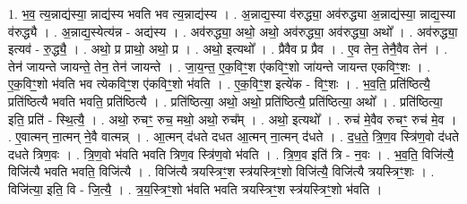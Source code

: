 \documentclass[17pt]{extarticle}
\begin{document}
1. भ॒व॒ त्य॒न्नाद्य॑स्या॒ न्नाद्य॑स्य भवति भव त्य॒न्नाद्य॑स्य । . अ॒न्नाद्य॒स्या व॑रुद्ध्या॒ अव॑रुद्ध्या अ॒न्नाद्य॑स्या॒ न्नाद्य॒स्या व॑रुद्ध्यै । . अ॒न्नाद्य॒स्येत्य॑न्न - अद्य॑स्य । . अव॑रुद्ध्या॒ अथो॒ अथो॒ अव॑रुद्ध्या॒ अव॑रुद्ध्या॒ अथो᳚ । . अव॑रुद्ध्या॒ इत्यव॑ - रु॒द्ध्यै॒ । . अथो॒ प्र प्राथो॒ अथो॒ प्र । . अथो॒ इत्यथो᳚ । . प्रैवैव प्र प्रैव । . ए॒व तेन॒ तेनै॒वैव तेन॑ । . तेन॑ जायन्ते जायन्ते॒ तेन॒ तेन॑ जायन्ते । . जा॒य॒न्त॒ ए॒क॒विꣳ॒॒श ए॑कविꣳ॒॒शो जा॑यन्ते जायन्त एकविꣳ॒॒शः । . ए॒क॒विꣳ॒॒शो भ॑वति भव त्येकविꣳ॒॒श ए॑कविꣳ॒॒शो भ॑वति । . ए॒क॒विꣳ॒॒श इत्ये॑क - विꣳ॒॒शः । . भ॒व॒ति॒ प्रति॑ष्ठित्यै॒ प्रति॑ष्ठित्यै भवति भवति॒ प्रति॑ष्ठित्यै । . प्रति॑ष्ठित्या॒ अथो॒ अथो॒ प्रति॑ष्ठित्यै॒ प्रति॑ष्ठित्या॒ अथो᳚ । . प्रति॑ष्ठित्या॒ इति॒ प्रति॑ - स्थि॒त्यै॒ । . अथो॒ रुचꣳ॒॒ रुच॒ मथो॒ अथो॒ रुच᳚म् । . अथो॒ इत्यथो᳚ । . रुच॑ मे॒वैव रुचꣳ॒॒ रुच॑ मे॒व । . ए॒वात्मन् ना॒त्मन् ने॒वै वात्मन्न् । . आ॒त्मन् द॑धते दधत आ॒त्मन् ना॒त्मन् द॑धते । . द॒ध॒ते॒ त्रि॒ण॒व स्त्रि॑ण॒वो द॑धते दधते त्रिण॒वः । . त्रि॒ण॒वो भ॑वति भवति त्रिण॒व स्त्रि॑ण॒वो भ॑वति । . त्रि॒ण॒व इति॑ त्रि - न॒वः । . भ॒व॒ति॒ विजि॑त्यै॒ विजि॑त्यै भवति भवति॒ विजि॑त्यै । . विजि॑त्यै त्रयस्त्रिꣳ॒॒श स्त्र॑यस्त्रिꣳ॒॒शो विजि॑त्यै॒ विजि॑त्यै त्रयस्त्रिꣳ॒॒शः । . विजि॑त्या॒ इति॒ वि - जि॒त्यै॒ । . त्र॒य॒स्त्रिꣳ॒॒शो भ॑वति भवति त्रयस्त्रिꣳ॒॒श स्त्र॑यस्त्रिꣳ॒॒शो भ॑वति । \newline
\end{document}
